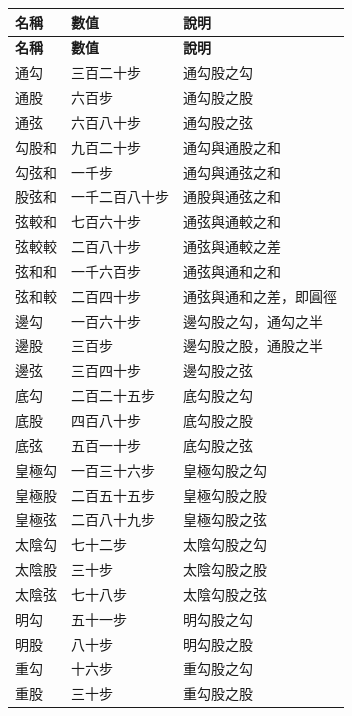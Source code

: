 \documentclass[11pt,a4paper]{article}
\begin{document}
\begin{center}
\begin{longtable}{|l|l|l|}
\hline
\textbf{名稱} & \textbf{數值} & \textbf{說明} \\
\hline
\endfirsthead
\hline
\textbf{名稱} & \textbf{數值} & \textbf{說明} \\
\hline
\endhead
通勾 & 三百二十步 & 通勾股之勾 \\
\hline
通股 & 六百步 & 通勾股之股 \\
\hline
通弦 & 六百八十步 & 通勾股之弦 \\
\hline
勾股和 & 九百二十步 & 通勾與通股之和 \\
\hline
勾弦和 & 一千步 & 通勾與通弦之和 \\
\hline
股弦和 & 一千二百八十步 & 通股與通弦之和 \\
\hline
弦較和 & 七百六十步 & 通弦與通較之和 \\
\hline
弦較較 & 二百八十步 & 通弦與通較之差 \\
\hline
弦和和 & 一千六百步 & 通弦與通和之和 \\
\hline
弦和較 & 二百四十步 & 通弦與通和之差，即圓徑 \\
\hline
邊勾 & 一百六十步 & 邊勾股之勾，通勾之半 \\
\hline
邊股 & 三百步 & 邊勾股之股，通股之半 \\
\hline
邊弦 & 三百四十步 & 邊勾股之弦 \\
\hline
底勾 & 二百二十五步 & 底勾股之勾 \\
\hline
底股 & 四百八十步 & 底勾股之股 \\
\hline
底弦 & 五百一十步 & 底勾股之弦 \\
\hline
皇極勾 & 一百三十六步 & 皇極勾股之勾 \\
\hline
皇極股 & 二百五十五步 & 皇極勾股之股 \\
\hline
皇極弦 & 二百八十九步 & 皇極勾股之弦 \\
\hline
太陰勾 & 七十二步 & 太陰勾股之勾 \\
\hline
太陰股 & 三十步 & 太陰勾股之股 \\
\hline
太陰弦 & 七十八步 & 太陰勾股之弦 \\
\hline
明勾 & 五十一步 & 明勾股之勾 \\
\hline
明股 & 八十步 & 明勾股之股 \\
\hline
重勾 & 十六步 & 重勾股之勾 \\
\hline
重股 & 三十步 & 重勾股之股 \\
\hline
\end{longtable}
\end{center}
\end{document}
